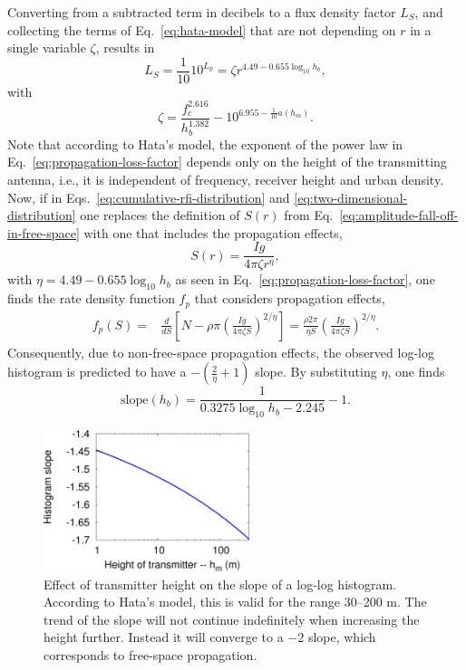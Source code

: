 \documentclass[useAMS,usenatbib]{mn2e}
\begin{document}
Converting from a subtracted term in decibels to a flux density factor $L_S$, and collecting the terms of Eq.~\eqref{eq:hata-model} that are not depending on $r$ in a single variable $\zeta$, results in
\begin{equation} \label{eq:propagation-loss-factor}
 L_S = \frac{1}{10} 10^{L_p} = \zeta r^{4.49 - 0.655 \log_{10} h_b},
\end{equation}
with
\begin{equation} \label{eq:zeta-definition}
 \zeta = \frac{f_c^{2.616}}{h_b^{1.382}} - 10^{6.955-\frac{1}{10} a(h_m)}.
\end{equation}
Note that according to Hata's model, the exponent of the power law in Eq.~\eqref{eq:propagation-loss-factor} depends only on the height of the transmitting antenna, i.e., it is independent of frequency, receiver height and urban density. Now, if in Eqs.~\eqref{eq:cumulative-rfi-distribution} and \eqref{eq:two-dimensional-distribution} one replaces the definition of $S(r)$ from Eq.~\eqref{eq:amplitude-fall-off-in-free-space} with one that includes the propagation effects,
\begin{equation}
 S(r) = \frac{Ig}{4\pi \zeta r^\eta},
\end{equation}
with $\eta = 4.49 - 0.655 \log_{10} h_b$ as seen in Eq.~\eqref{eq:propagation-loss-factor}, one finds the rate density function $f_p$ that considers propagation effects,
\begin{align} \label{eq:frequency-density-with-propagation}
f_p(S)
= & \frac{d}{dS} \left[ N - \rho \pi \left( \frac{Ig }{4\pi\zeta S} \right)^{2/\eta} \right]
= \frac{\rho 2\pi}{\eta S} \left( \frac{Ig}{4\pi\zeta S} \right)^{2/\eta}.
\end{align}
Consequently, due to non-free-space propagation effects, the observed log-log histogram is predicted to have a $-(\frac{2}{\eta}+1)$ slope. By substituting $\eta$, one finds
\begin{equation}
\textrm{slope}(h_b) = \frac{1}{0.3275 \log_{10} h_b - 2.245} - 1.
\end{equation}
\begin{figure}
\begin{center}\hspace{-1cm}\includegraphics[width=6cm]{img/transmitter-height/plot-transmitter-height-trimmed}
\caption{Effect of transmitter height on the slope of a log-log histogram. According to Hata's model, this is valid for the range 30--200 m. The trend of the slope will not continue indefinitely when increasing the height further. Instead it will converge to a $-2$ slope, which corresponds to free-space propagation.}
\label{fig:plot-transmitter-height}
\end{center}
\end{figure}
\end{document}
